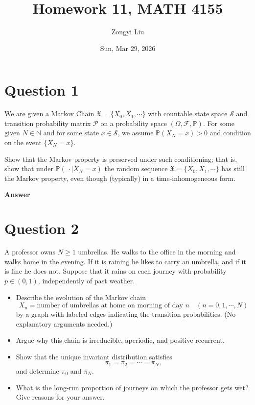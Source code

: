 \documentclass[letterpaper]{article}
\title{Homework 11, MATH 4155}
\author{Zongyi Liu}
\date{Sun, Mar 29, 2026}
\begin{document}
		\maketitle
		\section{Question 1}
		
		We are given a Markov Chain $\mathfrak{X} = \{X_0, X_1, \cdots\}$ with countable state space $\mathcal{S}$ and transition probability matrix $\mathcal{P}$ on a probability space $(\Omega, \mathcal{F}, \mathbb{P})$. For some given $N \in \mathbb{N}$ and for some state $x \in \mathcal{S}$, we assume $\mathbb{P}(X_N = x) > 0$ and condition on the event $\{X_N = x\}$.
		
		\indent Show that the Markov property is preserved under such conditioning; that is, show that under $\mathbb{P}(\,\cdot \mid X_N = x)$ the random sequence $\mathfrak{X} = \{X_0, X_1, \cdots\}$ has still the Markov property, even though (typically) in a time-inhomogeneous form.
		
		
		\textbf{Answer}
		
		\clearpage
		
		\section{Question 2}
		
		A professor owns $N \geq 1$ umbrellas. He walks to the office in the morning and walks home in the evening. If it is raining he likes to carry an umbrella, and if it is fine he does not. Suppose that it rains on each journey with probability $p \in (0,1)$, independently of past weather.
		\begin{itemize}
			\item[(i)] Describe the evolution of the Markov chain
			\[
			X_n = \text{number of umbrellas at home on morning of day } n \quad (n = 0, 1, \cdots, N)
			\]
			by a graph with labeled edges indicating the transition probabilities. (No explanatory arguments needed.)
			\item[(ii)] Argue why this chain is irreducible, aperiodic, and positive recurrent.
			\item[(iii)] Show that the unique invariant distribution satisfies
			\[
			\pi_1 = \pi_2 = \cdots = \pi_N,
			\]
			and determine $\pi_0$ and $\pi_N$.
			\item[(iv)] What is the long-run proportion of journeys on which the professor gets wet? Give reasons for your answer.
		\end{itemize}
		
\end{document}
